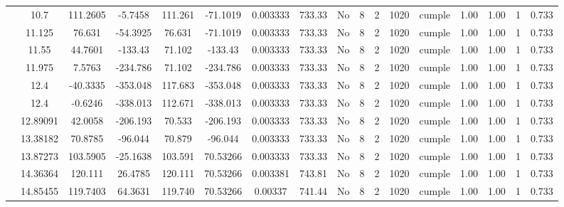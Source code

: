 \begin{table}[H]
{\begin{tabular}{|c|c|c|c|c|c|c|c|c|c|c|c|c|c|c|c|c|}
\cline{2-17}        & 10.7 & 111.2605 & -5.7458 & 111.261 & -71.1019 & 0.003333 & 733.33 & No  & 8   & 2   & 1020 & \cellcolor[rgb]{ .776,  .937,  .808}cumple & 1.00 & 1.00 & 1   & 0.733 \bigstrut\\
\cline{2-17}        & 11.125 & 76.631 & -54.3925 & 76.631 & -71.1019 & 0.003333 & 733.33 & No  & 8   & 2   & 1020 & \cellcolor[rgb]{ .776,  .937,  .808}cumple & 1.00 & 1.00 & 1   & 0.733 \bigstrut\\
\cline{2-17}        & 11.55 & 44.7601 & -133.43 & 71.102 & -133.43 & 0.003333 & 733.33 & No  & 8   & 2   & 1020 & \cellcolor[rgb]{ .776,  .937,  .808}cumple & 1.00 & 1.00 & 1   & 0.733 \bigstrut\\
\cline{2-17}        & 11.975 & 7.5763 & -234.786 & 71.102 & -234.786 & 0.003333 & 733.33 & No  & 8   & 2   & 1020 & \cellcolor[rgb]{ .776,  .937,  .808}cumple & 1.00 & 1.00 & 1   & 0.733 \bigstrut\\
\cline{2-17}        & \cellcolor[rgb]{ .851,  .882,  .949}12.4 & -40.3335 & -353.048 & 117.683 & -353.048 & 0.003333 & 733.33 & No  & 8   & 2   & 1020 & \cellcolor[rgb]{ .776,  .937,  .808}cumple & 1.00 & 1.00 & 1   & 0.733 \bigstrut\\
\cline{2-17}        & \cellcolor[rgb]{ .851,  .882,  .949}12.4 & -0.6246 & -338.013 & 112.671 & -338.013 & 0.003333 & 733.33 & No  & 8   & 2   & 1020 & \cellcolor[rgb]{ .776,  .937,  .808}cumple & 1.00 & 1.00 & 1   & 0.733 \bigstrut\\
\cline{2-17}        & 12.89091 & 42.0058 & -206.193 & 70.533 & -206.193 & 0.003333 & 733.33 & No  & 8   & 2   & 1020 & \cellcolor[rgb]{ .776,  .937,  .808}cumple & 1.00 & 1.00 & 1   & 0.733 \bigstrut\\
\cline{2-17}        & 13.38182 & 70.8785 & -96.044 & 70.879 & -96.044 & 0.003333 & 733.33 & No  & 8   & 2   & 1020 & \cellcolor[rgb]{ .776,  .937,  .808}cumple & 1.00 & 1.00 & 1   & 0.733 \bigstrut\\
\cline{2-17}        & 13.87273 & 103.5905 & -25.1638 & 103.591 & 70.53266 & 0.003333 & 733.33 & No  & 8   & 2   & 1020 & \cellcolor[rgb]{ .776,  .937,  .808}cumple & 1.00 & 1.00 & 1   & 0.733 \bigstrut\\
\cline{2-17}        & 14.36364 & 120.111 & 26.4785 & 120.111 & 70.53266 & 0.003381 & 743.81 & No  & 8   & 2   & 1020 & \cellcolor[rgb]{ .776,  .937,  .808}cumple & 1.00 & 1.00 & 1   & 0.733 \bigstrut\\
\cline{2-17}        & 14.85455 & 119.7403 & 64.3631 & 119.740 & 70.53266 & 0.00337 & 741.44 & No  & 8   & 2   & 1020 & \cellcolor[rgb]{ .776,  .937,  .808}cumple & 1.00 & 1.00 & 1   & 0.733 \bigstrut\\

\end{tabular}}
\end{table}
